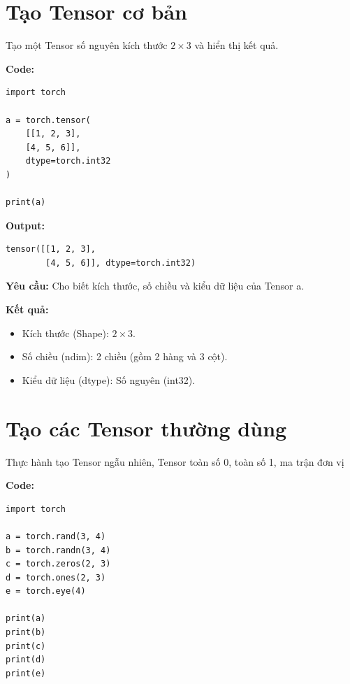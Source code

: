 \documentclass[12pt,a4paper]{article}
\begin{document}
% 
\newpage
\thispagestyle{empty}
\renewcommand{\contentsname}{MỤC LỤC}
\begingroup
\titleformat{\section}[block]{\centering\bfseries\Large}{}{0pt}{}
\tableofcontents
\endgroup
\thispagestyle{empty}
\cleardoublepage


\section{Tạo Tensor cơ bản}
Tạo một Tensor số nguyên kích thước $2 \times 3$ và hiển thị kết quả.

\textbf{Code:}
\begin{verbatim}
import torch

a = torch.tensor(
    [[1, 2, 3],
    [4, 5, 6]],
    dtype=torch.int32
)

print(a)
\end{verbatim}

\textbf{Output:}
\begin{verbatim}
tensor([[1, 2, 3],
        [4, 5, 6]], dtype=torch.int32)
\end{verbatim}

\textbf{Yêu cầu:}
Cho biết kích thước, số chiều và kiểu dữ liệu của Tensor a.


\textbf{Kết quả:}
\begin{itemize}
    \item Kích thước (Shape): $2 \times 3$.
    \item Số chiều (ndim): 2 chiều (gồm 2 hàng và 3 cột).
    \item Kiểu dữ liệu (dtype): Số nguyên (int32).
\end{itemize}


\section{Tạo các Tensor thường dùng}
Thực hành tạo Tensor ngẫu nhiên, Tensor toàn số 0, toàn số 1, ma trận đơn vị 

\textbf{Code:}
\begin{verbatim}
import torch

a = torch.rand(3, 4)
b = torch.randn(3, 4)
c = torch.zeros(2, 3)
d = torch.ones(2, 3)
e = torch.eye(4)

print(a)
print(b)
print(c)
print(d)
print(e)
\end{verbatim}
\end{document}
